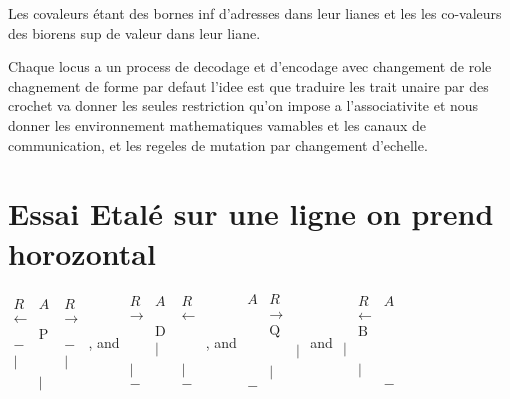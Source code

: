 \documentclass{article}
\begin{document}
Les covaleurs étant des bornes inf d'adresses  dans leur lianes et les les co-valeurs des biorens sup de valeur dans leur liane.

Chaque locus a un process de decodage et d'encodage avec changement de role chagnement de forme par defaut 
l'idee est que traduire les trait unaire par des crochet va donner les seules restriction qu'on impose a l'associativite et nous donner les environnement mathematiques vamables et les canaux de communication, et les regeles de mutation par changement d'echelle.

\section{Essai Etalé sur une  ligne on prend horozontal}



$\begin{matrix}
 R&A&R\\
\leftarrow&&\rightarrow\\
&\text{P }&\\
-&&-\\
|&&|\\
&|&
\end{matrix}$ ,   and 
$\begin{matrix}
 R&A&R\\
\rightarrow &&\leftarrow \\
&\text{D }&\\
&|&\\
|&&|\\
-&&-\\
\end{matrix}$ , and    
$\begin{matrix}
 A&R&\\
&\rightarrow &\\
&\text{Q }&\\
&&|\\
&|&\\
-&&\\
\end{matrix}$  
and    
$\begin{matrix}
 &R&A\\
&\leftarrow &\\
&\text{B }&\\
|&&\\
&|&\\
&&-\\
\end{matrix}$ 
\end{document}
